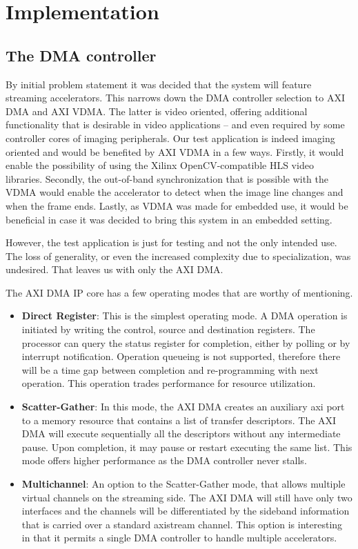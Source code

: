 \section{Implementation}

\subsection{The DMA controller}

By initial problem statement it was decided that the system will feature
streaming accelerators. This narrows down the DMA controller selection
to AXI DMA and AXI VDMA. The latter is video oriented, offering additional
functionality that is desirable in video applications -- and even required
by some controller cores of imaging peripherals. Our test application
is indeed imaging oriented and would be benefited by AXI VDMA in a few ways.
Firstly, it would enable the possibility of using the Xilinx OpenCV-compatible
HLS video libraries. Secondly, the out-of-band synchronization that is possible
with the VDMA would enable the accelerator to detect when the image line changes
and when the frame ends. Lastly, as VDMA was made for embedded use, it would be
beneficial in case it was decided to bring this system in an embedded setting.

However, the test application is just for testing and not the only intended use.
The loss of generality, or even the increased complexity due to specialization,
was undesired. That leaves us with only the AXI DMA.

The AXI DMA IP core has a few operating modes that are worthy of mentioning.

\begin{itemize}
\item	\textbf{Direct Register}: 
	This is the simplest operating mode. A DMA operation is initiated 
	by writing the control, source and destination registers.
	The processor can query the status register for completion, 
	either by polling or by interrupt notification.
	Operation queueing is not supported, therefore there will be a time gap 
	between completion and re-programming with next operation.
	This operation trades performance for resource utilization.
\item	\textbf{Scatter-Gather}:
	In this mode, the AXI DMA creates an auxiliary \gls{axi} port
	to a memory resource that contains a list of transfer descriptors.
	The AXI DMA will execute sequentially all the descriptors without
	any intermediate pause. Upon completion, it may pause or restart
	executing the same list. This mode offers higher performance 
	as the DMA controller never stalls.
\item	\textbf{Multichannel}: 
	An option to the Scatter-Gather mode,
	that allows multiple virtual channels on the streaming side.
	The AXI DMA will still have only two interfaces and the channels
	will be differentiated by the sideband information that is carried
	over a standard \gls{axistream} channel. This option is interesting
	in that it permits a single DMA controller to handle multiple accelerators.
\end{itemize}

